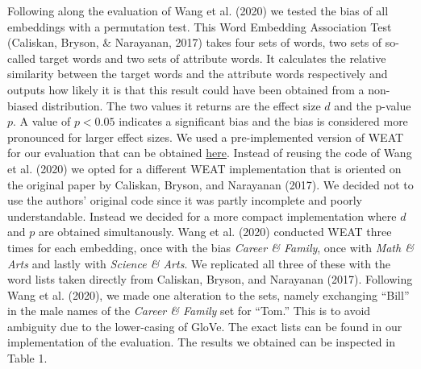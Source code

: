 \documentclass[
  english,
  man,floatsintext]{apa6}
\begin{document}
Following along the evaluation of Wang et al. (2020) we tested the bias of all embeddings with a permutation test. This Word Embedding Association Test (Caliskan, Bryson, \& Narayanan, 2017) takes four sets of words, two sets of so-called target words and two sets of attribute words. It calculates the relative similarity between the target words and the attribute words respectively and outputs how likely it is that this result could have been obtained from a non-biased distribution. The two values it returns are the effect size \(d\) and the p-value \(p\). A value of \(p<0.05\) indicates a significant bias and the bias is considered more pronounced for larger effect sizes.
We used a pre-implemented version of WEAT for our evaluation that can be obtained \href{https://github.com/shivaomrani/HumanBiasInSemantics}{here}. Instead of reusing the code of Wang et al. (2020) we opted for a different WEAT implementation that is oriented on the original paper by Caliskan, Bryson, and Narayanan (2017). We decided not to use the authors' original code since it was partly incomplete and poorly understandable. Instead we decided for a more compact implementation where \(d\) and \(p\) are obtained simultanously.
Wang et al. (2020) conducted WEAT three times for each embedding, once with the bias \emph{Career \& Family}, once with \emph{Math \& Arts} and lastly with \emph{Science \& Arts}. We replicated all three of these with the word lists taken directly from Caliskan, Bryson, and Narayanan (2017). Following Wang et al. (2020), we made one alteration to the sets, namely exchanging ``Bill'' in the male names of the \emph{Career \& Family} set for ``Tom.'' This is to avoid ambiguity due to the lower-casing of GloVe. The exact lists can be found in our implementation of the evaluation.
The results we obtained can be inspected in Table 1.
\end{document}
